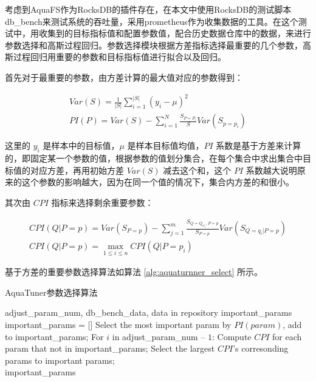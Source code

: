 考虑到AquaFS作为RocksDB的插件存在，在本文中使用RocksDB的测试脚本db\_bench来测试系统的吞吐量，采用prometheus作为收集数据的工具。在这个测试中，用收集到的目标指标值和配置参数值，配合历史数据仓库中的数据，来进行参数选择和高斯过程回归。参数选择模块根据方差指标选择最重要的几个参数，高斯过程回归用重要的参数和目标指标值进行拟合以及回归。

首先对于最重要的参数，由方差计算的最大值对应的参数得到：

\begin{equation}
  \label{eq:var}
  \begin{aligned}
    Var(S)=\frac{1}{\lvert S\rvert}\sum_{i=1}^{\lvert S\rvert}(y_i-\mu)^2 \\
    PI(P)=Var(S)-\sum_{i=1}^{N}\frac{S_{P=P_i}}{S}Var(S_{p=p_i})
  \end{aligned}
\end{equation}

这里的 $y_i$ 是样本中的目标值，$\mu$ 是样本目标值均值，$PI$ 系数是基于方差来计算的，即固定某一个参数的值，根据参数的值划分集合，在每个集合中求出集合中目标值的对应方差，再用初始方差 $Var(S)$ 减去这个和，这个 $PI$ 系数越大说明原来的这个参数的影响越大，因为在同一个值的情况下，集合内方差的和很小。

其次由 $CPI$ 指标来选择剩余重要参数：

\begin{equation}
  \label{eq:cpi}
  \begin{aligned}
    CPI(Q|P=p) = Var(S_{P=p})-\sum_{j=1}^{m}\frac{S_{Q=Q_{w_j},P=p}}{S_{P=p}}Var(S_{Q=q_i|P=p})\\
    CPI(Q|P=p) = \max_{1\le i\le n}CPI(Q|P=p_i)
  \end{aligned}
\end{equation}

基于方差的重要参数选择算法如算法 \ref{alg:aquaturnner_select} 所示。

\begin{algorithm}[htb]
  \caption{ AquaTuner参数选择算法 }
  \label{alg:aquaturnner_select}
  \begin{algorithmic}[1]
    \Require
      adjust\_param\_num, db\_bench\_data, data in repository
    \Ensure
      important\_params
    \State important\_params = []
    \State Select the most important param by $PI(param)$, add to important\_params;
    \State For $i$ in adjust\_param\_num $–$ $1$:
    \State \qquad Compute $CPI$ for each param that not in important\_params;
    \State \qquad Select the largest $CPI$’s corresonding params to important params; \\
    \Return important\_params
  \end{algorithmic}
\end{algorithm}

